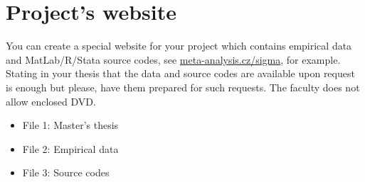 \chapter{Project's website}

You can create a special website for your project which contains empirical data and MatLab/R/Stata source codes, see \href{http://meta-analysis.cz/sigma/}{meta-analysis.cz/sigma}, for example. Stating in your thesis that the data and source codes are available upon request is enough but please, have them prepared for such requests. The faculty does not allow enclosed DVD.

\begin{itemize}
		\item File 1: Master's thesis
    \item File 2: Empirical data    
		\item File 3: Source codes
\end{itemize}

